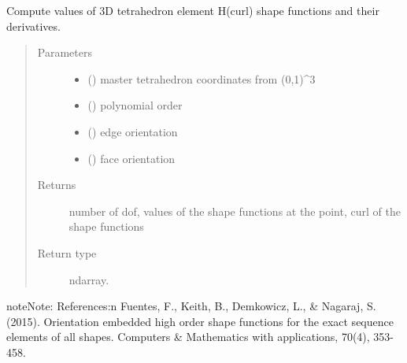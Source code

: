 \documentclass[letterpaper,10pt,english]{sphinxmanual}
\begin{document}
\begin{fulllineitems}
\label{\detokenize{petgem/hvfem:petgem.hvfem.shape3DETet}}
Compute values of 3D tetrahedron element H(curl) shape functions and their derivatives.
\begin{quote}\begin{description}
\item[{Parameters}] \leavevmode\begin{itemize}
\item {} 
 () \textendash{} master tetrahedron coordinates from (0,1)\textasciicircum{}3

\item {} 
 () \textendash{} polynomial order

\item {} 
 () \textendash{} edge orientation

\item {} 
 () \textendash{} face orientation

\end{itemize}

\item[{Returns}] \leavevmode
number of dof, values of the shape functions at the point, curl of the shape functions

\item[{Return type}] \leavevmode
ndarray.

\end{description}\end{quote}

\begin{sphinxadmonition}{note}{Note:}
References:n
Fuentes, F., Keith, B., Demkowicz, L., \& Nagaraj, S. (2015). Orientation
embedded high order shape functions for the exact sequence elements of
all shapes. Computers \& Mathematics with applications, 70(4), 353-458.
\end{sphinxadmonition}

\end{fulllineitems}
\end{document}
